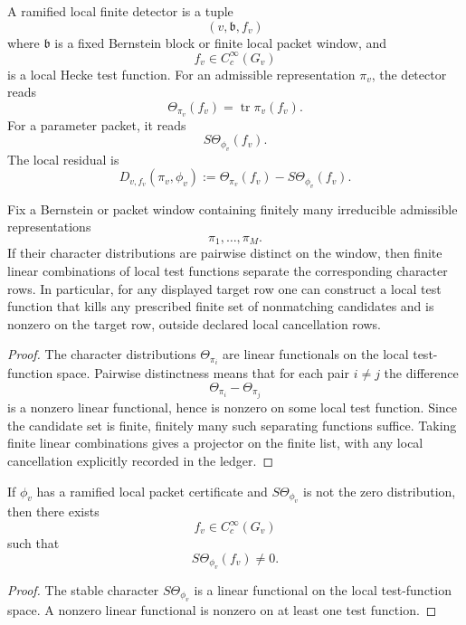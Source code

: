 \begin{definition}
\label{def:unified-reality-ramified-local-finite-detector}
A ramified local finite detector is a tuple
$$
(v,\mathfrak b,f_v)
$$
where $\mathfrak b$ is a fixed Bernstein block or finite local packet
window, and
$$
f_v\in C_c^\infty(G_v)
$$
is a local Hecke test function. For an admissible representation
$\pi_v$, the detector reads
$$
\Theta_{\pi_v}(f_v)=\operatorname{tr}\pi_v(f_v).
$$
For a parameter packet, it reads
$$
S\Theta_{\phi_v}(f_v).
$$
The local residual is
$$
D_{v,f_v}(\pi_v,\phi_v)
:=
\Theta_{\pi_v}(f_v)-S\Theta_{\phi_v}(f_v).
$$
\end{definition}

\begin{theorem}
\label{thm:unified-reality-local-character-separation}
Fix a Bernstein or packet window containing finitely many irreducible
admissible representations
$$
\pi_1,\ldots,\pi_M.
$$
If their character distributions are pairwise distinct on the window,
then finite linear combinations of local test functions separate the
corresponding character rows. In particular, for any displayed target
row one can construct a local test function that kills any prescribed
finite set of nonmatching candidates and is nonzero on the target row,
outside declared local cancellation rows.
\end{theorem}
\begin{proof}
The character distributions $\Theta_{\pi_i}$ are linear functionals on
the local test-function space. Pairwise distinctness means that for
each pair $i\ne j$ the difference
$$
\Theta_{\pi_i}-\Theta_{\pi_j}
$$
is a nonzero linear functional, hence is nonzero on some local test
function. Since the candidate set is finite, finitely many such
separating functions suffice. Taking finite linear combinations gives a
projector on the finite list, with any local cancellation explicitly
recorded in the ledger.
\end{proof}

\begin{theorem}
\label{thm:unified-reality-ramified-local-state-nonzero}
If $\phi_v$ has a ramified local packet certificate and
$S\Theta_{\phi_v}$ is not the zero distribution, then there exists
$$
f_v\in C_c^\infty(G_v)
$$
such that
$$
S\Theta_{\phi_v}(f_v)\ne0.
$$
\end{theorem}
\begin{proof}
The stable character $S\Theta_{\phi_v}$ is a linear functional on the
local test-function space. A nonzero linear functional is nonzero on at
least one test function.
\end{proof}

